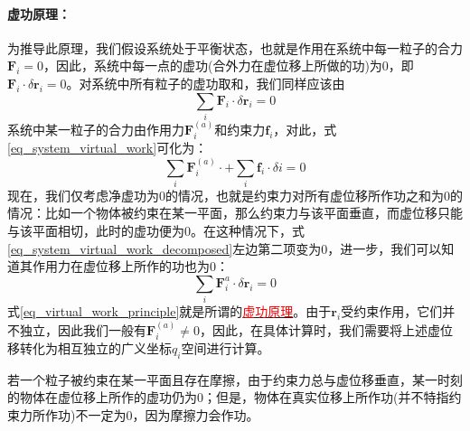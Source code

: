 \paragraph*{虚功原理：}为推导此原理，我们假设系统处于平衡状态，也就是作用在系统中每一粒子的合力$\bm{F}_i = 0$，因此，系统中每一点的虚功(合外力在虚位移上所做的功)为0，即$\bm{F}_i \cdot \delta \bm{r}_i =0$。对系统中所有粒子的虚功取和，我们同样应该由
\begin{equation}
	\sum_i \bm{F}_i \cdot \delta \bm{r}_i  = 0 \label{eq_system_virtual_work}
\end{equation} 
系统中某一粒子的合力由作用力$\bm{F}^{(a)}_i$和约束力$\bm{f}_i$，对此，式\eqref{eq_system_virtual_work}可化为：
\begin{equation}
	\sum_i \bm{F}^{(a)}_i \cdot + \sum_i \bm{f}_i \cdot \delta i = 0	\label{eq_system_virtual_work_decomposed}
\end{equation} 
现在，我们仅考虑净虚功为0的情况，也就是约束力对所有虚位移所作功之和为0的情况：比如一个物体被约束在某一平面，那么约束力与该平面垂直，而虚位移只能与该平面相切，此时的虚功便为0。在这种情况下，式\eqref{eq_system_virtual_work_decomposed}左边第二项变为0，进一步，我们可以知道其作用力在虚位移上所作的功也为0：
\begin{equation}
	\sum_i \bm{F}^a_i \cdot \delta \bm{r}_i = 0	\label{eq_virtual_work_principle}
\end{equation} 
式\eqref{eq_virtual_work_principle}就是所谓的\underline{\textcolor{red}{虚功原理}}。由于$\bm{r}_i$受约束作用，它们并不独立，因此我们一般有$\bm{F}^{(a)}_i \neq 0$，因此，在具体计算时，我们需要将上述虚位移转化为相互独立的广义坐标$q_i$空间进行计算。
\begin{note}
	若一个粒子被约束在某一平面且存在摩擦，由于约束力总与虚位移垂直，某一时刻的物体在虚位移上所作的虚功仍为0；但是，物体在真实位移上所作功(并不特指约束力所作功)不一定为0，因为摩擦力会作功。
\end{note}

